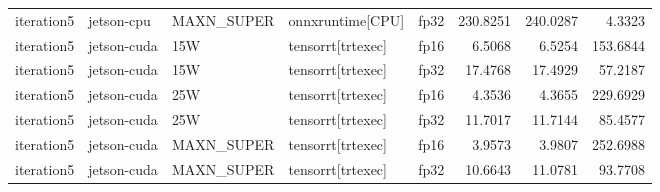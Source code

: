 \begin{table}
\begin{tabular}{lllllrrr}
iteration5 & jetson-cpu & MAXN\_SUPER & onnxruntime[CPU] & fp32 & 230.8251 & 240.0287 & 4.3323 \\
iteration5 & jetson-cuda & 15W & tensorrt[trtexec] & fp16 & 6.5068 & 6.5254 & 153.6844 \\
iteration5 & jetson-cuda & 15W & tensorrt[trtexec] & fp32 & 17.4768 & 17.4929 & 57.2187 \\
iteration5 & jetson-cuda & 25W & tensorrt[trtexec] & fp16 & 4.3536 & 4.3655 & 229.6929 \\
iteration5 & jetson-cuda & 25W & tensorrt[trtexec] & fp32 & 11.7017 & 11.7144 & 85.4577 \\
iteration5 & jetson-cuda & MAXN\_SUPER & tensorrt[trtexec] & fp16 & 3.9573 & 3.9807 & 252.6988 \\
iteration5 & jetson-cuda & MAXN\_SUPER & tensorrt[trtexec] & fp32 & 10.6643 & 11.0781 & 93.7708 \\
\bottomrule
\end{tabular}
\end{table}

